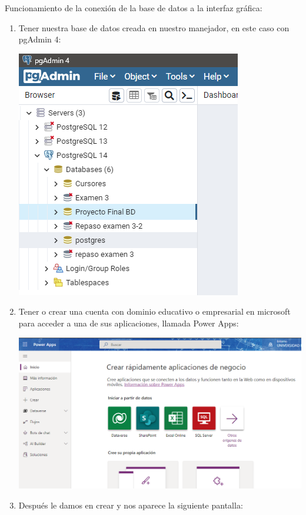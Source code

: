 \documentclass[letter,12pt]{article} %
\begin{document}
Funcionamiento de la conexión de la base de datos a la interfaz gráfica:
\begin{enumerate}
\item Tener nuestra base de datos creada en nuestro manejador, en este caso con pgAdmin 4:
\begin{center} 
\includegraphics[scale=0.85]{imagenes/P01.png}
\end{center}
\newpage 
\item Tener o crear una cuenta con dominio educativo o empresarial en microsoft para acceder a una de sus aplicaciones, llamada Power Apps:
\begin{center} 
\includegraphics[scale=0.53]{imagenes/P02.png}
\end{center} 
\item Después le damos en crear y nos aparece la siguiente pantalla:
\begin{center} 

\end{center}
\end{enumerate}
\end{document}
